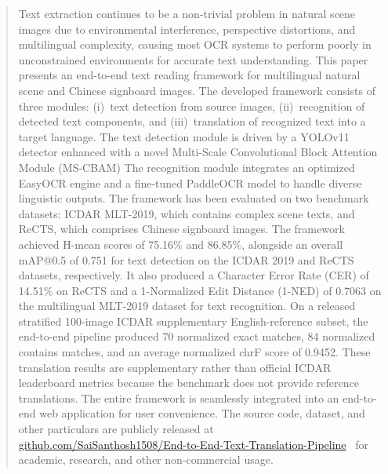 \documentclass{ieeeaccess}
\begin{document}
\begin{abstract}
Text extraction continues to be a non-trivial problem in natural scene images due to environmental interference, perspective distortions, and multilingual complexity, causing most OCR systems to perform poorly in unconstrained environments for accurate text understanding. This paper presents an end-to-end text reading framework for multilingual natural scene and Chinese signboard images. The developed framework consists of three modules: (i)~text detection from source images, (ii)~recognition of detected text components, and (iii)~translation of recognized text into a target language. The text detection module is driven by a YOLOv11 detector enhanced with a novel Multi-Scale Convolutional Block Attention Module (MS-CBAM)  The recognition module integrates an optimized EasyOCR engine and a fine-tuned PaddleOCR model to handle diverse linguistic outputs. The framework has been evaluated on two benchmark datasets: ICDAR MLT-2019, which contains complex scene texts, and ReCTS, which comprises Chinese signboard images. The framework achieved H-mean scores of 75.16\% and 86.85\%, alongside an overall mAP@0.5 of 0.751 for text detection on the ICDAR 2019 and ReCTS datasets, respectively. It also produced a Character Error Rate (CER) of 14.51\% on ReCTS and a 1-Normalized Edit Distance (1-NED) of 0.7063 on the multilingual MLT-2019 dataset for text recognition. On a released stratified 100-image ICDAR supplementary English-reference subset, the end-to-end pipeline produced 70 normalized exact matches, 84 normalized contains matches, and an average normalized chrF score of 0.9452. These translation results are supplementary rather than official ICDAR leaderboard metrics because the benchmark does not provide reference translations. The entire framework is seamlessly integrated into an end-to-end web application for user convenience. The source code, dataset, and other particulars are publicly released at
\href{https://github.com/SaiSanthosh1508/End-to-End-Text-Translation-Pipeline}{github.com/SaiSanthosh1508/End-to-End-Text-Translation-Pipeline}~\cite{b1}
for academic, research, and other non-commercial usage.
\end{abstract}
\end{document}
